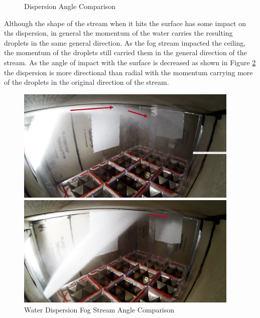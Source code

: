 \documentclass[12pt,oneside]{book}
\begin{document}
\begin{figure}[H]
\begin{minipage}[b]{0.45\textwidth}
	\end{minipage}
	\caption{Dispersion Angle Comparison}
	\label{fig:SS_Dispersion_Arrow}
\end{figure}

Although the shape of the stream when it hits the surface has some impact on ths dispersion, in general the momentum of the water carries the resulting droplets in the same general direction. As the fog stream impacted the ceiling, the momentum of the droplets still carried them in the general direction of the stream. As the angle of impact with the surface is decreased as shown in Figure \ref{fig:ImpactFogStream} the dispersion is more directional than radial with the momentum carrying more of the droplets in the original direction of the stream.

\begin{figure}[H]
	\centering
	\begin{minipage}[b]{0.45\textwidth}
	\centering
	\includegraphics[width=0.95\textwidth]{Figures/Water_Distribution/Nozzle_Directions/Interior_MaxAngleCeiling_Fog_Arrows.png}
	\end{minipage}
	\begin{minipage}[b]{0.45\textwidth}
	\centering
	\includegraphics[width=0.95\textwidth]{Figures/Water_Distribution/Nozzle_Directions/Interior_MidCeiling_Fog_Arrows.png} 
	\end{minipage}
	\caption{Water Dispersion Fog Stream Angle Comparison}
	\label{fig:ImpactFogStream}
\end{figure}
\end{document}
